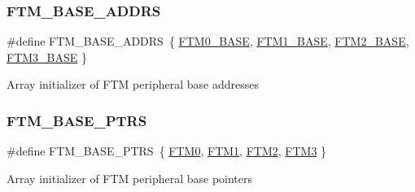 \subsubsection{\texorpdfstring{F\+T\+M\+\_\+\+B\+A\+S\+E\+\_\+\+A\+D\+D\+RS}{FTM\_BASE\_ADDRS}}
{\footnotesize\ttfamily \#define F\+T\+M\+\_\+\+B\+A\+S\+E\+\_\+\+A\+D\+D\+RS~\{ \mbox{\hyperlink{group___f_t_m___register___masks_ga2ababc70fbf6b51c721d870fa1c66e45}{F\+T\+M0\+\_\+\+B\+A\+SE}}, \mbox{\hyperlink{group___f_t_m___register___masks_ga15ff8bad7e6945154dcffe5dc7404fd1}{F\+T\+M1\+\_\+\+B\+A\+SE}}, \mbox{\hyperlink{group___f_t_m___register___masks_ga5f4976435e0a348f88929eaf23157bad}{F\+T\+M2\+\_\+\+B\+A\+SE}}, \mbox{\hyperlink{group___f_t_m___register___masks_gad7c56aa0db6bb5d095ce67d04031c615}{F\+T\+M3\+\_\+\+B\+A\+SE}} \}}

Array initializer of F\+TM peripheral base addresses \mbox{\label{group___f_t_m___register___masks_ga1a5a7cb39d1713239478a1ebce2f05cc}} 
\subsubsection{\texorpdfstring{F\+T\+M\+\_\+\+B\+A\+S\+E\+\_\+\+P\+T\+RS}{FTM\_BASE\_PTRS}}
{\footnotesize\ttfamily \#define F\+T\+M\+\_\+\+B\+A\+S\+E\+\_\+\+P\+T\+RS~\{ \mbox{\hyperlink{group___f_t_m___register___masks_gac20d96b96f80ded87aa187f7519699ee}{F\+T\+M0}}, \mbox{\hyperlink{group___f_t_m___register___masks_ga48157ff57e27603582bc154901d44301}{F\+T\+M1}}, \mbox{\hyperlink{group___f_t_m___register___masks_gad4b8561c440952d2f7b095e4a7399a18}{F\+T\+M2}}, \mbox{\hyperlink{group___f_t_m___register___masks_ga60c8197c39b5da920e82cf4a4c8b2f49}{F\+T\+M3}} \}}

Array initializer of F\+TM peripheral base pointers \mbox{\label{group___f_t_m___register___masks_ga446917a6d809030218b9c8b208a19928}} 
